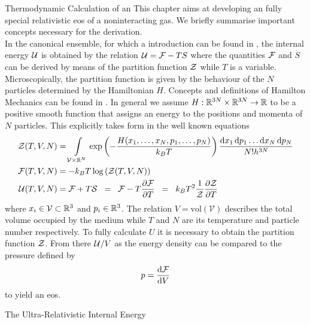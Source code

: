 \begin{section}{Thermodynamic Calculation of an }
This chapter aims at developing an fully special relativistic \ac{eos} of a noninteracting gas.
We briefly summarise important concepts necessary for the derivation.\\
In the canonical ensemble, for which a introduction can be found in \cite{fliessbachStatistischePhysikLehrbuch2018}, the internal energy $\mathcal{U}$ is obtained by the relation $\mathcal{U}=\mathcal{F}-TS$ where the quantities $\mathcal{F}$ and $S$ can be derived by means of the partition function $\mathcal{Z}$ while $T$ is a variable.
Microscopically, the partition function is given by the behaviour of the $N$ particles determined by the Hamiltonian $H$.
Concepts and definitions of Hamilton Mechanics can be found in \cite{eschrigTopologyGeometryPhysics2011, fliessbachMechanikLehrbuchZur2020, spivakPhysicsMathematiciansMechanics2010}.
In general we assume $H:\mathbb{R}^{3N}\times\mathbb{R}^{3N}\rightarrow\mathbb{R}$ to be a positive smooth function that assigns an energy to the positions and momenta of $N$ particles.
This explicitly takes form in the well known equations
\begin{align}
	\mathcal{Z}(T,V,N) 	&= \int\limits_{\mathcal{V}\times\mathbb{R}^N}\exp\left(-\frac{H(x_1,\dots,x_N,p_1,\dots,p_N)}{k_BT}\right)\frac{\mathop{}\!\mathrm{d} x_1\mathop{}\!\mathrm{d} p_1\dots \mathop{}\!\mathrm{d} x_N\mathop{}\!\mathrm{d} p_N}{N!h^{3N}}\\
	\mathcal{F}(T,V,N) 	&= - k_BT\log\left(\mathcal{Z}(T,V,N)\right)\label{2-IntEner-FreeEnerDef}\\
	\mathcal{U}(T,V,N) 	&= \mathcal{F} + T \mathcal{S} \hspace{0.2cm}=\hspace{0.2cm} \mathcal{F} - T\frac{\partial\mathcal{F}}{\partial T} \hspace{0.2cm}=\hspace{0.2cm} k_BT^2\frac{1}{\mathcal{Z}}\frac{\partial\mathcal{Z}}{\partial T}\label{2-IntEner-Def}
\end{align}
where $x_i\in \mathcal{V}\subset\mathbb{R}^3$  and $p_i\in \mathbb{R}^3$. The relation $V=\text{vol}(\mathcal{V})$ describes the total volume occupied by the medium while $T$ and $N$ are its temperature and particle number respectively.
To fully calculate $U$ it is necessary to obtain the partition function $\mathcal{Z}$.
From there $\mathcal{U}/V$ as the energy density can be compared to the pressure defined by
\begin{equation}
	p=\frac{\mathop{}\!\mathrm{d}\mathcal{F}}{\mathop{}\!\mathrm{d} V}
	\label{2-IntEner-pressureDef}
\end{equation}
to yield an \ac{eos}.
%
%
%
\begin{subsection}{The Ultra-Relativistic Internal Energy}

\end{subsection}
\end{section}

